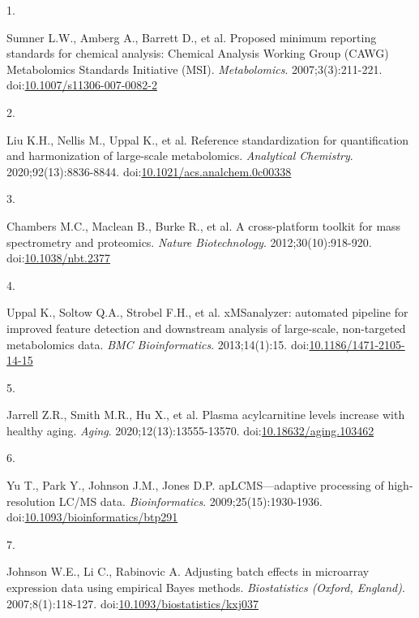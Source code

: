 \documentclass[
]{article}
\newlength{\cslhangindent}
\newlength{\csllabelwidth}
\newenvironment{CSLReferences}[2] %
 {\begin{list}{}{%
  \setlength{\itemindent}{0pt}
  \setlength{\leftmargin}{0pt}
  \setlength{\parsep}{0pt}
  \ifodd #1
   \setlength{\leftmargin}{\cslhangindent}
   \setlength{\itemindent}{-1\cslhangindent}
  \fi
  \setlength{\itemsep}{#2\baselineskip}}}
 {\end{list}}
\newcommand{\CSLLeftMargin}[1]{\parbox[t]{\csllabelwidth}{\strut#1\strut}}
\newcommand{\CSLRightInline}[1]{\parbox[t]{\linewidth - \csllabelwidth}{\strut#1\strut}}
\begin{document}
\protect{}\label{refs}
\begin{CSLReferences}{0}{1}
\CSLLeftMargin{1. }%
\CSLRightInline{Sumner L.W., Amberg A., Barrett D., et al. Proposed
minimum reporting standards for chemical analysis: {Chemical Analysis
Working Group} ({CAWG}) {Metabolomics Standards Initiative} ({MSI}).
\emph{Metabolomics}. 2007;3(3):211-221.
doi:\href{https://doi.org/10.1007/s11306-007-0082-2}{10.1007/s11306-007-0082-2}}

\CSLLeftMargin{2. }%
\CSLRightInline{Liu K.H., Nellis M., Uppal K., et al. Reference
standardization for quantification and harmonization of large-scale
metabolomics. \emph{Analytical Chemistry}. 2020;92(13):8836-8844.
doi:\href{https://doi.org/10.1021/acs.analchem.0c00338}{10.1021/acs.analchem.0c00338}}

\CSLLeftMargin{3. }%
\CSLRightInline{Chambers M.C., Maclean B., Burke R., et al. A
cross-platform toolkit for mass spectrometry and proteomics.
\emph{Nature Biotechnology}. 2012;30(10):918-920.
doi:\href{https://doi.org/10.1038/nbt.2377}{10.1038/nbt.2377}}

\CSLLeftMargin{4. }%
\CSLRightInline{Uppal K., Soltow Q.A., Strobel F.H., et al.
{xMSanalyzer}: {automated} pipeline for improved feature detection and
downstream analysis of large-scale, non-targeted metabolomics data.
\emph{BMC Bioinformatics}. 2013;14(1):15.
doi:\href{https://doi.org/10.1186/1471-2105-14-15}{10.1186/1471-2105-14-15}}

\CSLLeftMargin{5. }%
\CSLRightInline{Jarrell Z.R., Smith M.R., Hu X., et al. Plasma
acylcarnitine levels increase with healthy aging. \emph{Aging}.
2020;12(13):13555-13570.
doi:\href{https://doi.org/10.18632/aging.103462}{10.18632/aging.103462}}

\CSLLeftMargin{6. }%
\CSLRightInline{Yu T., Park Y., Johnson J.M., Jones D.P.
{apLCMS}---{adaptive} processing of high-resolution {LC/MS} data.
\emph{Bioinformatics}. 2009;25(15):1930-1936.
doi:\href{https://doi.org/10.1093/bioinformatics/btp291}{10.1093/bioinformatics/btp291}}

\CSLLeftMargin{7. }%
\CSLRightInline{Johnson W.E., Li C., Rabinovic A. Adjusting batch
effects in microarray expression data using empirical {Bayes} methods.
\emph{Biostatistics (Oxford, England)}. 2007;8(1):118-127.
doi:\href{https://doi.org/10.1093/biostatistics/kxj037}{10.1093/biostatistics/kxj037}}


\end{CSLReferences}
\end{document}

